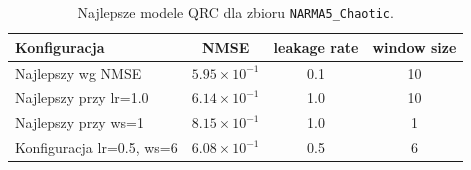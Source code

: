 \begin{table}[ht]
\centering
\caption{Najlepsze modele QRC dla zbioru \texttt{NARMA5\_Chaotic}.}
\label{tab:qrc-narma5_chaotic}
\begin{tabular}{lccc}
\toprule
Konfiguracja & NMSE & leakage rate & window size \\
\midrule
Najlepszy wg NMSE & $5.95 \times 10^{-1}$ & 0.1 & 10 \\
Najlepszy przy lr=1.0 & $6.14 \times 10^{-1}$ & 1.0 & 10 \\
Najlepszy przy ws=1 & $8.15 \times 10^{-1}$ & 1.0 & 1 \\
Konfiguracja lr=0.5, ws=6 & $6.08 \times 10^{-1}$ & 0.5 & 6 \\
\bottomrule
\end{tabular}
\end{table}
